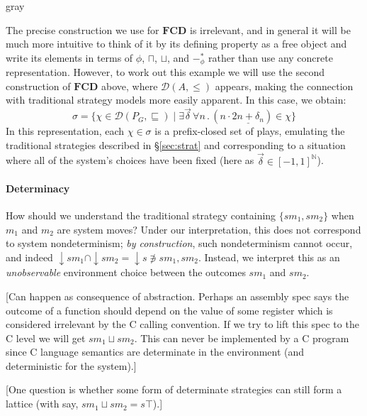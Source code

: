 \documentclass[sigplan,10pt,review,anonymous]{acmart}
\begin{document}
\begin{color}{gray}

The precise construction we use for $\mathbf{FCD}$ is irrelevant,
and in general it will be much more intuitive
to think of it by its defining property as a free object and
write its elements in terms of $\phi$, $\sqcap$, $\sqcup$, and $-_\phi^*$
rather than use any concrete representation.
However, to work out this example
we will use the second construction of $\mathbf{FCD}$ above,
where $\mathcal{D}(A, {\le})$ appears,
making the connection with traditional strategy models
more easily apparent.
In this case, we obtain:
\[
    \sigma =
    \{ \chi \in \mathcal{D}(P_G, {\sqsubseteq}) \mid
       \exists \vec{\delta} \,
       \forall n \,.\,
       (n \cdot \underline{2n + \delta_n}) \in \chi \}
\]
In this representation,
each $\chi \in \sigma$
is a prefix-closed set of plays,
emulating the traditional strategies described in \S\ref{sec:strat}
and corresponding to a situation where all of the system's choices
have been fixed (here as $\vec{\delta} \in [-1,1]^\mathbb{N}$).

\end{color}


\paragraph{Determinacy} %

How should we understand
the traditional strategy containing $\{ sm_1, sm_2 \}$
when $m_1$ and $m_2$ are system moves?
Under our interpretation,
this does not correspond to
system nondeterminism;
\emph{by construction},
such nondeterminism cannot occur,
and indeed
${\downarrow} s m_1 \cap {\downarrow} s m_2 =
 {\downarrow} s \notni
 s m_1, s m_2$.
Instead,
we interpret this as an \emph{unobservable}
environment choice
between the outcomes $s m_1$ and $s m_2$.

[Can happen as consequence of abstraction.
Perhaps an assembly spec says
the outcome of a function should depend on the value of some
register which is considered irrelevant by the C calling convention.
If we try to lift this spec to the C level
we will get $s m_1 \sqcup s m_2$.
This can never be implemented by a C program
since C language semantics are determinate in the environment
(and deterministic for the system).]

[One question is whether
some form of determinate strategies
can still form a lattice
(with say, $sm_1 \sqcup sm_2 = s \top$).]
\end{document}
